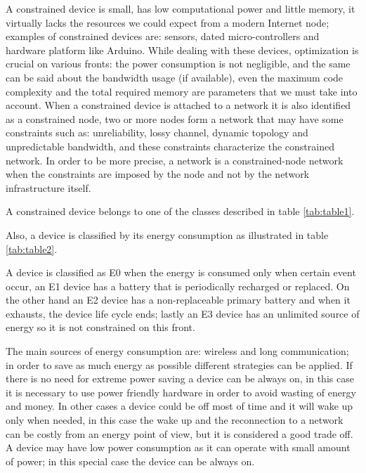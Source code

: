 	
	A constrained device is small, has low computational power and little memory, it virtually lacks the resources
	we could expect from a modern Internet node; examples of constrained devices are: sensors, dated micro-controllers and hardware platform like Arduino.\newline
	While dealing with these devices, optimization is crucial on various fronts: the power consumption is not negligible,
	and the same can be said about the bandwidth usage (if available), even the maximum code complexity and the total required memory are parameters that we must take into account.\newline
	When a constrained device is attached to a network it is also identified as a constrained node, two or more nodes form a network that may have some constraints such as: unreliability, lossy channel, dynamic topology and unpredictable bandwidth, and these constraints characterize the constrained network.\newline
	In order to be more precise, a network is a constrained-node network when the constraints are imposed by the node
	and not by the network infrastructure itself.
	
	
	
	A constrained device belongs to one of the classes described in table \ref{tab:table1}.\newline
	
	
	Also, a device is classified by its energy consumption as illustrated in table \ref{tab:table2}.
	
	A device is classified as E0 when the energy is consumed only when certain event occur, an E1 device has a battery 
	that is periodically recharged or replaced.\newline
	On the other hand an E2 device has a non-replaceable primary battery and when it exhausts, the device life cycle ends; lastly an E3 device has an unlimited source of energy so it is not constrained on this front.\newline 
	
	The main sources of energy consumption are: wireless and long communication; in order to save as much energy as possible different strategies can be applied.\newline
	If there is no need for extreme power saving a device can be always on, in this case it is necessary to use power friendly hardware in order to avoid wasting of energy and money.\newline
	In other cases a device could be off most of time and it will wake up only when needed, in this case the wake up and the reconnection to a network can be costly from an energy point of view, but it is considered a good trade off.\newline
	A device may have low power consumption as it can operate with small amount of power; in this special case the device can be always on.
	
